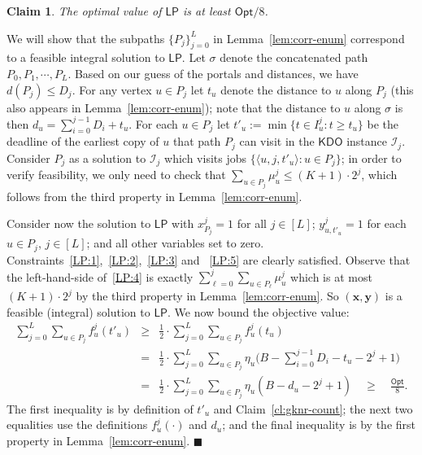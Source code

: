 \documentclass[11pt,letterpaper]{article}
\newtheorem{claim}[theorem]{Claim}
\numberwithin{algorithm}{section}
\newenvironment{proof}{

\noindent{\bf Proof:}}
{\hfill$\blacksquare$


}
\newcommand{\I}{{\mathcal{I}}}
\newcommand{\Opt}{\ensuremath{\mathsf{Opt}}\xspace}
\newcommand{\kdo}{\ensuremath{\mathsf{KDO}}\xspace}
\newcommand{\lp}{\ensuremath{\mathsf{LP}}\xspace}
\begin{document}
\begin{claim}\label{cl:LP-obj}
The optimal value of \lp is at least $\Opt/8$.
\end{claim}
\begin{proof}
We will show that the subpaths $\{P_j\}_{j=0}^L$ in Lemma~\ref{lem:corr-enum} correspond to a feasible integral solution to \lp. 
Let $\sigma$ denote the concatenated path $P_0,P_1,\cdots,P_L$.
Based on our guess of the portals and distances, we have $d(P_j)\le D_j$. For any vertex $u\in P_j$ let $t_u$ denote the distance to $u$ along $P_j$ (this also appears in Lemma~\ref{lem:corr-enum}); note that the distance to $u$ along $\sigma$ is then $d_u=\sum_{i=0}^{j-1}D_i + t_u$. For each $u\in P_j$ let $t'_u:=\min\{t\in I^j_u : t\ge t_u\}$ be the deadline of the earliest copy of $u$ that path $P_j$ can visit in the \kdo instance $\I_j$. Consider $P_j$ as a solution to $\I_j$ which visits jobs $\{\langle u,j,t'_u\rangle : u\in P_j\}$; in order to verify feasibility, we only need to check that $\sum_{u\in P_j} \mu^j_u\le (K+1)\cdot 2^j$, which follows from the third property in Lemma~\ref{lem:corr-enum}.

Consider now the solution to \lp with $x^j_{P_j}=1$ for all $j\in [L]$; $y^j_{u,t'_u}=1$ for each $u\in P_j$, $j\in[L]$; and all other variables set to zero. Constraints~\eqref{LP:1},~\eqref{LP:2},~\eqref{LP:3} and ~\eqref{LP:5} are clearly satisfied. Observe that the left-hand-side of~\eqref{LP:4} is exactly $\sum_{\ell=0}^j \sum_{u\in P_\ell} \mu^j_u$ which is at most $(K+1)\cdot 2^j$ by the third property in Lemma~\ref{lem:corr-enum}. So $(\mathbf{x}, \mathbf{y})$ is a feasible (integral) solution to \lp. We now bound the objective value:
\begin{eqnarray*}
\sum_{j=0}^L \sum_{u\in P_j} f^j_u(t'_u) &\ge &\frac12 \cdot \sum_{j=0}^L \sum_{u\in P_j} f^j_u(t_u) \\
&= & \frac12 \cdot \sum_{j=0}^L \sum_{u\in P_j} \eta_u\big(B-\sum_{i=0}^{j-1}D_i -t_u-2^j+1\big) \\
&= & \frac12 \cdot \sum_{j=0}^L \sum_{u\in P_j} \eta_u\left(B-d_u-2^j+1\right)\quad \ge \quad \frac{\Opt}{8}.
\end{eqnarray*}
The first inequality is by definition of $t'_u$ and Claim~\ref{cl:gknr-count}; the next two equalities use the definitions $f^j_u(\cdot)$ and $d_u$; and the final inequality is by the first property in Lemma~\ref{lem:corr-enum}.
\end{proof}
\end{document}
